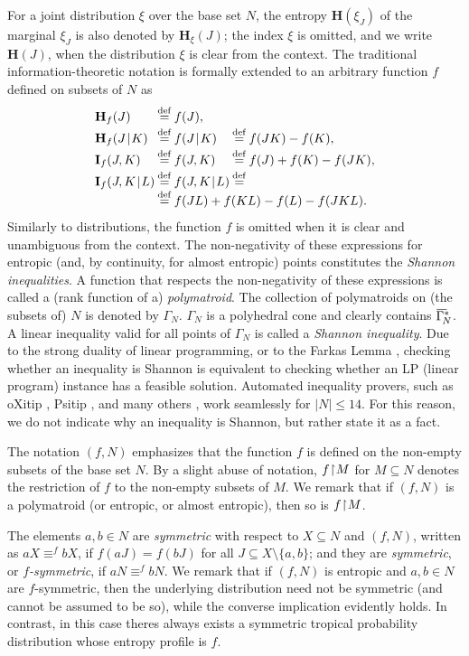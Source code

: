 \documentclass[10pt,a4paper]{amsart}
\def\|{\mskip1.5mu{|}\mskip1.5mu}
\def\H{\mathbf H}
\def\I{\mathbf I}
\newcommand\restr{\mkern1mu{\upharpoonright}\mkern1mu}
\newcommand\GN{\Gamma_{\!N}}
\def\barGamma{\mkern1mu\overline{\hbox{$\mkern-1mu\Gamma\mkern4mu$}}\mkern-4mu}
\def\clGa#1{\barGamma^*_{\!#1}}
\newcommand\eqdef{\stackrel{\mathrm{def}}{=}}
\begin{document}
For a joint distribution $\xi$ over the base set $N$, the entropy
$\H(\xi_J)$ of the marginal $\xi_J$ is also denoted by $\H_\xi(J)$; the
index $\xi$ is omitted, and we write $\H(J)$, when the distribution $\xi$ is
clear from the context. The traditional information-theoretic notation is
formally extended to an arbitrary function $f$ defined on subsets of $N$ as
$$\begin{array}{l@{\:\eqdef\:}l@{}l}
  \H_f(J) & f(J), \\[2pt]
  \H_f(J\|K) & f(J\|K) &{\:\eqdef\:} f(JK)-f(K), \\[2pt]
  \I_f(J,K)  & f(J,K)  &{\:\eqdef\:} f(J)+f(K)-f(JK), \\[2pt]
  \I_f(J,K\|L) & f(J,K\|L)&{\:\eqdef\:}\\
               & \hbox to 0pt{$f(JL)+f(KL)-f(L)-f(JKL).$\hss}
\end{array}$$
Similarly to distributions, the function $f$ is omitted when it is clear and
unambiguous from the context. The non-negativity of these expressions for
entropic (and, by continuity, for almost entropic) points constitutes the
\emph{Shannon inequalities}. A function that respects the non-negativity of
these expressions is called a (rank function of a) \emph{polymatroid}. The
collection of polymatroids on (the subsets of) $N$ is denoted by $\GN$.
$\GN$ is a polyhedral cone and clearly contains $\clGa N$. A linear
inequality valid for all points of $\GN$ is called a \emph{Shannon
inequality}. Due to the strong duality of linear programming, or to the
Farkas Lemma \cite{ziegler}, checking whether an inequality is Shannon is
equivalent to checking whether an LP (linear program) instance has a
feasible solution. Automated inequality provers, such as \textsf{oXitip}
\cite{ITIP}, \textsf{Psitip} \cite{Li23}, and many others \cite{W-auto},
work seamlessly for $|N|\le 14$. For this reason, we do not
indicate why an inequality is Shannon, but rather state it as a fact.
 
The notation $(f,N)$ emphasizes that the function $f$ is defined on the
non-empty subsets of the base set $N$. By a slight abuse of notation,
$f\restr M$ for $M\subseteq N$ denotes the restriction of $f$ to the
non-empty subsets of $M$. We remark that if $(f,N)$ is a polymatroid (or
entropic, or almost entropic), then so is $f\restr M$.

The elements $a,b\in N$ are \emph{symmetric} with respect to $X\subseteq N$
and $(f,N)$, written as $aX\equiv^f bX$, if $f(aJ)=f(bJ)$ for all $J
\subseteq X\setminus\{a,b\}$; and they are \emph{symmetric}, or
\emph{$f$-symmetric}, if $aN\equiv^f bN$. We remark that if $(f,N)$ is
entropic and $a,b\in N$ are $f$-symmetric, then the underlying distribution
need not be symmetric (and cannot be assumed to be so), while the converse
implication evidently holds. In contrast, in this case theres always exists a
symmetric tropical probability distribution whose entropy profile is $f$.
\end{document}
